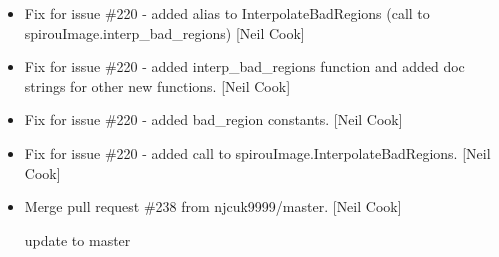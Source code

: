 \documentclass[a4paper,10pt,english]{report}
\begin{document}
\begin{itemize}
\item {} 
Fix for issue \#220 - added alias to InterpolateBadRegions (call to
spirouImage.interp\_bad\_regions) {[}Neil Cook{]}

\item {} 
Fix for issue \#220 - added interp\_bad\_regions function and added doc
strings for other new functions. {[}Neil Cook{]}

\item {} 
Fix for issue \#220 - added bad\_region constants. {[}Neil Cook{]}

\item {} 
Fix for issue \#220 - added call to spirouImage.InterpolateBadRegions.
{[}Neil Cook{]}

\item {} 
Merge pull request \#238 from njcuk9999/master. {[}Neil Cook{]}

update to master

\end{itemize}
\end{document}
